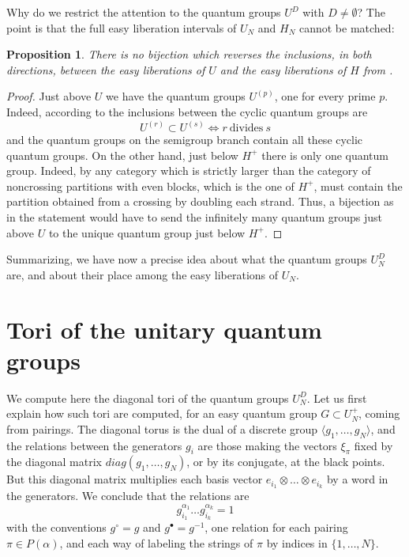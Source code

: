 \documentclass[11pt,a4paper]{article}
\newtheorem{prop}[thm]{Proposition}
\begin{document}
Why do we restrict the attention to the quantum groups $U^D$ with $D\neq\emptyset$? The point is that the full easy liberation intervals of $U_N$ and $H_N$ cannot be matched:

\begin{prop}
There is no bijection which reverses the inclusions, in both directions, between the easy liberations of $U$ and the easy liberations of $H$ from \cite{cyclic,semi,full}.
\end{prop}

\begin{proof}
Just above $U$ we have the quantum groups $U^{(p)}$, one for every prime $p$. Indeed, according to \cite{cyclic,semi} the inclusions between the cyclic quantum groups are
\[
 U^{(r)}\subset U^{(s)}\iff r\ \text{divides}\ s
\]
and the quantum groups on the semigroup branch contain all these cyclic quantum groups. On the other hand, just below $H^+$ there is only one quantum group. Indeed, by \cite{full} any category which is strictly larger than the category of noncrossing partitions with even blocks, which is the one of $H^+$, must contain the partition obtained from a crossing by doubling each strand. Thus, a bijection as in the statement would have to send the infinitely many quantum groups just above $U$ to the unique quantum group just below $H^+$.
\end{proof}

Summarizing, we have now a precise idea about what the quantum groups $U_N^D$ are, and about their place among the easy liberations of $U_N$.

\section{Tori of the unitary quantum groups}\label{tori}

We compute here the diagonal tori of the quantum groups $U_N^D$. Let us first explain how such tori are computed, for an easy quantum group $G\subset U_N^+$, coming from pairings. The diagonal torus is the dual of a discrete group $\langle g_1,\ldots,g_N\rangle$, and the relations between the generators $g_i$ are those making the vectors $\xi_\pi$ fixed by the diagonal matrix $diag(g_1,\ldots,g_N)$, or by its conjugate, at the black points. But this diagonal matrix multiplies each basis vector $e_{i_1}\otimes\ldots\otimes e_{i_k}$ by a word in the generators. We conclude that the relations are
\[
 g_{i_1}^{\alpha_1}\ldots g_{i_k}^{\alpha_k}=1
\]
with the conventions $g^\circ=g$ and $g^\bullet=g^{-1}$, one relation for each pairing $\pi\in P(\alpha)$, and each way of labeling the strings of $\pi$ by indices in $\{1,\ldots,N\}$.
\end{document}
